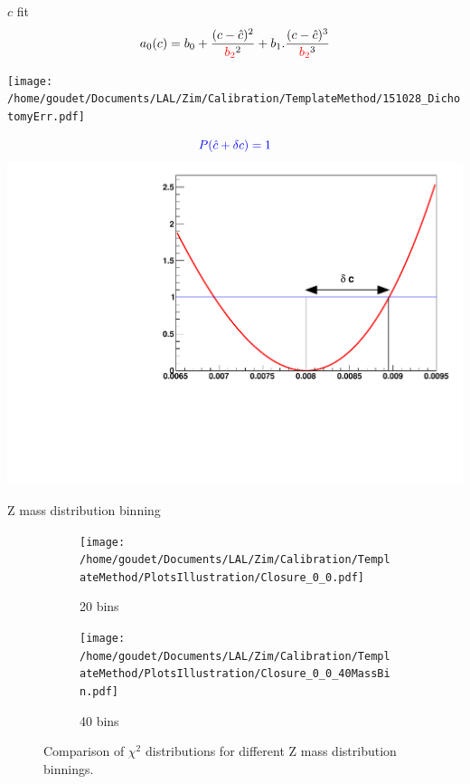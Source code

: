 \begin{frame}{$c$ fit }
  $$ a_0(c)=b_0+\frac{(c-\hat{c})^2}{\textcolor{red}{b_2}^2} + b_1 . \frac{(c-\hat{c})^3}{\textcolor{red}{b_2}^3}$$
  
  \begin{minipage}{0.49\linewidth}
    \texttt{[image: /home/goudet/Documents/LAL/Zim/Calibration/TemplateMethod/151028\_DichotomyErr.pdf]}
  \end{minipage}
  \hfill
  \begin{minipage}{0.49\linewidth}
    \begin{equation}
      \textcolor{blue}{P( \hat{c} + \delta c) = 1}
    \end{equation}
    \includegraphics[width=\linewidth]{Figures/pol3.pdf}
\end{minipage}
\end{frame}

\begin{frame}{Z mass distribution binning}
\begin{figure}
\begin{subfigure}[t]{0.49\linewidth}
\begin{center}
\texttt{[image: /home/goudet/Documents/LAL/Zim/Calibration/TemplateMethod/PlotsIllustration/Closure\_0\_0.pdf]}
\end{center}
\caption{20 bins}
\end{subfigure}
\begin{subfigure}[t]{0.49\linewidth}
\begin{center}
\texttt{[image: /home/goudet/Documents/LAL/Zim/Calibration/TemplateMethod/PlotsIllustration/Closure\_0\_0\_40MassBin.pdf]}
\end{center}
\caption{40 bins}
\end{subfigure}
\caption{\label{org955c893}
Comparison of $\chi^2$ distributions for different Z mass distribution binnings.}
\end{figure}
  \end{frame}

